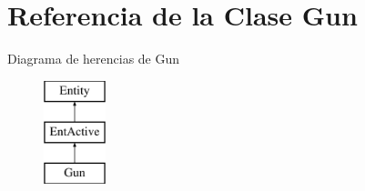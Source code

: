 \hypertarget{classGun}{\section{Referencia de la Clase Gun}
\label{classGun}
}
Diagrama de herencias de Gun\begin{figure}[H]
\begin{center}
\leavevmode
\includegraphics[height=3.000000cm]{classGun}
\end{center}
\end{figure}
